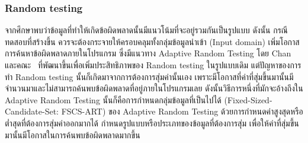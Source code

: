 \clearpage
\subsubsection{Random testing}

จากศึกษาพบว่าข้อมูลที่ทำให้เกิดข้อผิดพลาดนั้นมีแนวโน้มที่จะอยู่รวมกันเป็นรูปแบบ %
ดังนั้น กรณีทดสอบที่สร้างขึ้น
ควรจะต้องกระจายให้ครอบคลุมทั้งกลุ่มข้อมูลนำเข้า (Input domain) เพิ่มโอกาสการค้นหาข้อผิดพลาดภายในโปรแกรม ซึ่งมีแนวทาง Adaptive Random Testing
โดย Chan และคณะ \cite{Chan2004}\ ที่พัฒนาขึ้นเพื่อเพิ่มประสิทธิภาพของ Random testing ในรูปแบบเดิม แต่ปัญหาของการทำ Random testing
นั้นก็เกิดมาจากการต้องการสุ่มค่านั้นเอง เพราะมีโอกาสที่ค่าที่สุ่มขึ้นมานั้นมีจำนวนมาและไม่สามารถค้นพบข้อผิดพลาดที่อยู่ภายในโปรแกรมเลย 
ดังนั้นวิธีการหนึ่งที่มักจะอ้างถึงใน Adaptive Random Testing นั้นก็คือการกำหนดกลุ่มข้อมูลที่เป็นไปได้ (Fixed-Sized-Candidate-Set: FSCS-ART) 
ของ Adaptive Random Testing ด้วยการกำหนดค่าสูงสุดหรือต่ำสุดที่ต้องการสุ่มค่าออกมากได้ กำหนดรูปแบบหรือประเภทของข้อมูลที่ต้องการสุ่ม 
เพื่อให้ค่าที่สุ่มขึ้นมานั้นมีโอกาสในการค้นพบข้อผิดพลาดมากขึ้น %

